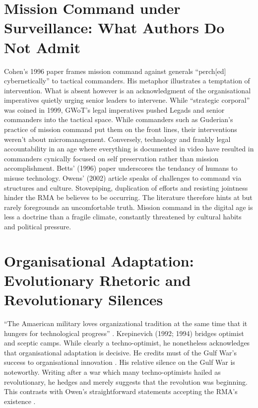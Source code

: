 \section{Mission Command under Surveillance: What Authors Do Not Admit}
Cohen's 1996 paper frames mission command against generals ``perch[ed] cybernetically'' to tactical commanders. His metaphor illustrates a temptation of intervention. What is absent however is an acknowledgment of the organisational imperatives quietly urging senior leaders to intervene. While \textcite{KRULAK_1999} ``strategic corporal'' was coined in 1999, GWoT's legal imperatives pushed Legads and senior commanders into the tactical space. While commanders such as Guderian's practice of mission command put them on the front lines, their interventions weren't about micromanagement. Conversely, technology and frankly legal accountability in an age where everything is documented in video have resulted in commanders cynically focused on self preservation rather than mission accomplishment. Betts' (1996) paper underscores the tendancy of humans to misuse technology. Owens' (2002) article speaks of challenges to command via structures and culture. Stovepiping, duplication of efforts and resisting jointness hinder the RMA be believes to be occurring. The literature therefore hints at but rarely foregrounds an uncomfortable truth. Mission command in the digital age is less a doctrine than a fragile climate, constantly threatened by cultural habits and political pressure.

\section{Organisational Adaptation: Evolutionary Rhetoric and Revolutionary Silences}
``The Amaerican military loves organizational tradition at the same time that it hungers for technological progress'' \parencite{BETTS_1996}. Krepinevich (1992; 1994) bridges optimist and sceptic camps. While clearly a techno-optimist, he nonetheless acknowledges that organisational adaptation is decisive. He credits must of the Gulf War's success to organisational innovation  \parencite[p.~8]{KREPINEVICH_1992}. His relative silence on the Gulf War is noteworthy. Writing after a war which many techno-optimists hailed as revolutionary, he hedges and merely suggests that the revolution was beginning. This contrasts with Owen's straightforward statements accepting the RMA's existence \parencite{OWENS_2002}.
 

